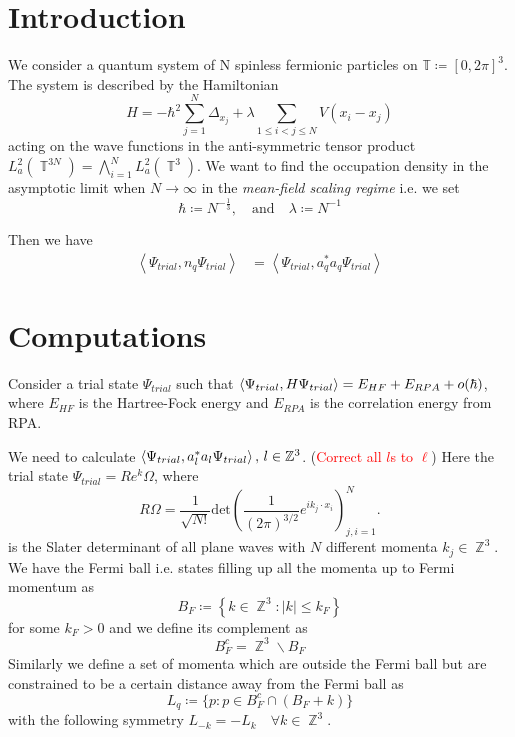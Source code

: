 \documentclass[sn-mathphys,Numbered, a4paper ,nocrop]{sn-jnl}%
\DeclareMathOperator{\Z}{\mathbb{Z}}
\DeclareMathOperator{\T}{\mathbb{T}}
\newcommand{\eva}[1]{\left\langle #1 \right\rangle}
\theoremstyle{plain}
\theoremstyle{definition}
\theoremstyle{remark}
\theoremstyle{plain}
\theoremstyle{definition}
\theoremstyle{remark}
\begin{document}
\section{Introduction}\label{sec1}
We consider a quantum system of N spinless fermionic particles on $\mathbb{T}\coloneq [0,2\pi]^3$. The system is described by the Hamiltonian
\begin{equation}
    H = -\hbar^2\sum\limits_{j=1}^{N}\Delta_{x_j} + \lambda\!\!\!\sum\limits_{1\leq i < j \leq N } V(x_i - x_j)
\end{equation}
acting on the wave functions in the anti-symmetric tensor product $L^2_a(\T^{3N}) = \bigwedge_{i=1}^N L^2_a(\T^3)$.
We want to find the occupation density in the asymptotic limit when $N\rightarrow\infty$ in the \textit{mean-field scaling regime} i.e. we set
\begin{equation}
    \hbar\coloneq N^{-\frac{1}{3}}, \quad\text{and}\quad \lambda \coloneq N^{-1}
\end{equation}



Then we have
\begin{align}
    \eva{\Psi_{trial},n_q\Psi_{trial}} &= \eva{\Psi_{trial},a^*_qa_q\Psi_{trial}} 
\end{align}

\section{Computations}\label{sec2}

Consider a trial state $\Psi_{trial}$ such that $\braket{\Psi_{trial},H\Psi_{trial}} = E_{HF} + E_{RPA}+ o(\hbar) $, where $E_{HF}$ is the Hartree-Fock energy and $E_{RPA}$ is the correlation energy from RPA.

We need to calculate $\braket{\Psi_{trial},a^*_la_l\Psi_{trial}},\, l\in\mathbb{Z}^3$. (\textcolor{red}{Correct all $l$s to $\ell$}) Here the trial state $\Psi_{trial}= Re^k\Omega$, where 
\begin{equation}
    R\Omega = \frac{1}{\sqrt{N!}}\text{det}\left(\frac{1}{(2\pi)^{3/2}}e^{ik_j\cdot x_i}\right)^N_{j,i=1}.
\end{equation}
is the Slater determinant of all plane waves with $N$ different momenta $k_j \in \Z^3$.
We have the Fermi ball i.e. states filling up all the momenta up to Fermi momentum as
\begin{equation}
    B_F\coloneq\left\{k\in \Z^3 : |k|\leq k_F\right\}
\end{equation}
for some $k_F>0$ and we define its complement as 
\begin{equation}
    B_F^c=\Z^3\backslash B_F
\end{equation}
Similarly we define a set of momenta which are outside the Fermi ball but are constrained to be a certain distance away from the Fermi ball as 
\begin{equation}
    L_q\coloneq \{p :p\in B_F^c \cap (B_F + k)\}
\end{equation}
with the following symmetry $L_{-k}=-L_k \quad\forall k \in \Z^3$.
\end{document}
